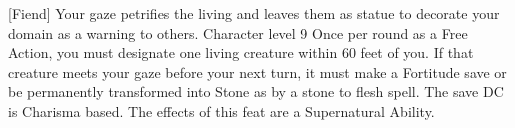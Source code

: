  {[Fiend]}
\shortdescfeat
{Your gaze petrifies the living and leaves them as statue to decorate your domain as a warning to others.}
{Character level 9}
{Once per round as a Free Action, you must designate one living creature within 60 feet of you. If that creature meets your gaze before your next turn, it must make a Fortitude save or be permanently transformed into Stone as by a stone to flesh spell. The save DC is Charisma based. The effects of this feat are a Supernatural Ability.}
